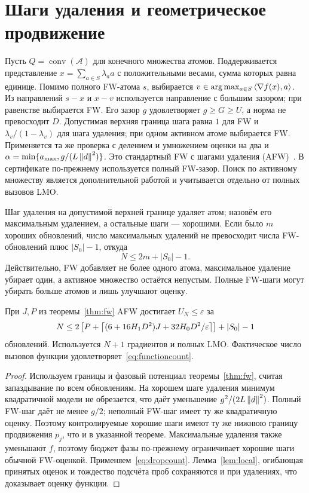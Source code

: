 \section{Шаги удаления и геометрическое продвижение}
Пусть $Q=\operatorname{conv}(\mathcal A)$ для конечного множества
атомов. Поддерживается представление $x=\sum_{a\in S}\lambda_a a$
с положительными весами, сумма которых равна единице. Помимо полного
FW-атома $s$, выбирается
$v\in\arg\max_{a\in S}\left\langle\nabla f(x),a\right\rangle$.
Из направлений $s-x$ и $x-v$ используется направление с большим
зазором; при равенстве выбирается FW. Его зазор $g$ удовлетворяет
$g\ge G\ge U$, а норма не превосходит $D$. Допустимая верхняя граница
шага равна $1$ для FW и $\lambda_v/(1-\lambda_v)$ для шага удаления;
при одном активном атоме выбирается FW. Применяется та же проверка
с делением и умножением оценки на два и
$\alpha=\min\{a_{\max},g/(L\left\|d\right\|^2)\}$.
Это стандартный FW с шагами удаления (AFW)~\cite{lacostejaggi,pedregosa}.
В сертификате по-прежнему используется полный FW-зазор. Поиск по
активному множеству является дополнительной работой и учитывается
отдельно от полных вызовов LMO.

Шаг удаления на допустимой верхней границе удаляет атом; назовём
его максимальным удалением, а остальные шаги — хорошими.
Если было $m$ хороших обновлений, число максимальных удалений не
превосходит числа FW-обновлений плюс $|S_0|-1$, откуда
\begin{equation}\label{eq:dropcount}
 N\le2m+|S_0|-1.
\end{equation}
Действительно, FW добавляет не более одного атома, максимальное
удаление убирает один, а активное множество остаётся непустым.
Полные FW-шаги могут убирать больше атомов и лишь улучшают оценку.

\begin{theorem}\label{thm:afw}
При $J,P$ из теоремы~\ref{thm:fw} AFW достигает
$U_N\le\varepsilon$ за
\[
 N\le2\left[P+\left\lceil(6+16H_1D^2)J+32H_0D^2/\varepsilon\right\rceil\right]
       +|S_0|-1
\]
обновлений. Используется $N+1$ градиентов и полных LMO.
Фактическое число вызовов функции удовлетворяет~\eqref{eq:functioncount}.
\end{theorem}
\begin{proof}
Используем границы и фазовый потенциал теоремы~\ref{thm:fw}, считая
запаздывание по всем обновлениям. На хорошем шаге удаления минимум
квадратичной модели не обрезается, что даёт уменьшение
$g^2/(2L\left\|d\right\|^2)$. Полный FW-шаг даёт не менее $g/2$;
неполный FW-шаг имеет ту же квадратичную оценку. Поэтому
контролируемые хорошие шаги имеют ту же нижнюю границу продвижения
$p_j$, что и в указанной теореме. Максимальные удаления также
уменьшают $f$, поэтому бюджет фазы по-прежнему ограничивает хорошие
шаги обычной FW-оценкой. Применяем~\eqref{eq:dropcount}.
Лемма~\ref{lem:local}, огибающая принятых оценок и тождество подсчёта
проб сохраняются и при удалениях, что доказывает оценку функции.
\end{proof}

